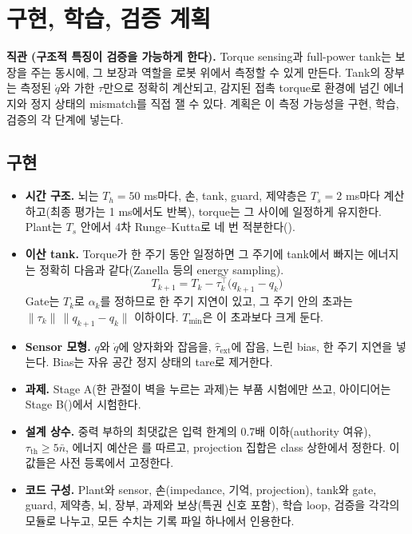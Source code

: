 \documentclass[11pt]{article}\usepackage[margin=1in]{geometry}\usepackage{amsmath,amssymb,amsthm,mathtools}\usepackage{graphicx}\graphicspath{{figures/}{../figures/}{figs/}{./}}\usepackage{enumitem}\usepackage{hyperref}\usepackage{cleveref}\usepackage{tikz}\usetikzlibrary{arrows.meta,positioning,calc,shapes.geometric}\usepackage{float}\usepackage{rotating}\usepackage[most]{tcolorbox}\usepackage{kotex}\usepackage{booktabs}\usepackage{longtable}\emergencystretch=1.6em\tolerance=2000 \crefname{assumption}{Assumption}{Assumptions}\Crefname{assumption}{Assumption}{Assumptions}\crefname{definition}{Definition}{Definitions}\Crefname{definition}{Definition}{Definitions}\crefname{proposition}{Proposition}{Propositions}\Crefname{proposition}{Proposition}{Propositions}\crefname{fact}{Fact}{Facts}\Crefname{fact}{Fact}{Facts} \newtheorem{assumption}{Assumption}\newtheorem{definition}{Definition}\newtheorem{lemma}{Lemma}\newtheorem{proposition}{Proposition}\newtheorem{theorem}{Theorem}\newtheorem{corollary}{Corollary}\newtheorem{fact}{Fact}\theoremstyle{remark}\newtheorem{remark}{Remark} \newcommand{\R}{\mathbb{R}}\newcommand{\xb}{\bar x}\newcommand{\Ab}{\bar A}\newcommand{\By}{\bar B_y}\newcommand{\U}{\mathcal U}\newcommand{\Z}{\mathcal Z}
\begin{document}
\section{구현, 학습, 검증 계획}
\label{sec:plan}

\textbf{직관 (구조적 특징이 검증을 가능하게 한다).} Torque sensing과 full-power tank는 보장을 주는 동시에, 그 보장과 역할을 로봇 위에서 측정할 수 있게 만든다. Tank의 장부는 측정된 $\dot q$와 가한 $\tau$만으로 정확히 계산되고, 감지된 접촉 torque로 환경에 넘긴 에너지와 정지 상태의 mismatch를 직접 잴 수 있다. 계획은 이 측정 가능성을 구현, 학습, 검증의 각 단계에 넣는다.

\subsection{구현}

\begin{itemize}
\item \textbf{시간 구조.} 뇌는 $T_h=50$ ms마다, 손, tank, guard, 제약층은 $T_s=2$ ms마다 계산하고(최종 평가는 1 ms에서도 반복), torque는 그 사이에 일정하게 유지한다. Plant는 $T_s$ 안에서 4차 Runge--Kutta로 네 번 적분한다().
\item \textbf{이산 tank.} Torque가 한 주기 동안 일정하면 그 주기에 tank에서 빠지는 에너지는 정확히 다음과 같다(Zanella 등의 energy sampling).
\[
T_{k+1}=T_k-\tau_k^\top\big(q_{k+1}-q_k\big)
\]
Gate는 $T_k$로 $\alpha_k$를 정하므로 한 주기 지연이 있고, 그 주기 안의 초과는 $\|\tau_k\|\,\|q_{k+1}-q_k\|$ 이하이다. $T_{\min}$은 이 초과보다 크게 둔다.
\item \textbf{Sensor 모형.} $q$와 $\dot q$에 양자화와 잡음을, $\hat\tau_{\mathrm{ext}}$에 잡음, 느린 bias, 한 주기 지연을 넣는다. Bias는 자유 공간 정지 상태의 tare로 제거한다.
\item \textbf{과제.} Stage A(한 관절이 벽을 누르는 과제)는 부품 시험에만 쓰고, 아이디어는 Stage B()에서 시험한다.
\item \textbf{설계 상수.} 중력 부하의 최댓값은 입력 한계의 0.7배 이하(authority 여유), $\tau_{\mathrm{th}}\ge5\bar n$, 에너지 예산은 를 따르고, projection 집합은 class 상한에서 정한다. 이 값들은 사전 등록에서 고정한다.
\item \textbf{코드 구성.} Plant와 sensor, 손(impedance, 기억, projection), tank와 gate, guard, 제약층, 뇌, 장부, 과제와 보상(특권 신호 포함), 학습 loop, 검증을 각각의 모듈로 나누고, 모든 수치는 기록 파일 하나에서 인용한다.
\end{itemize}
\end{document}
